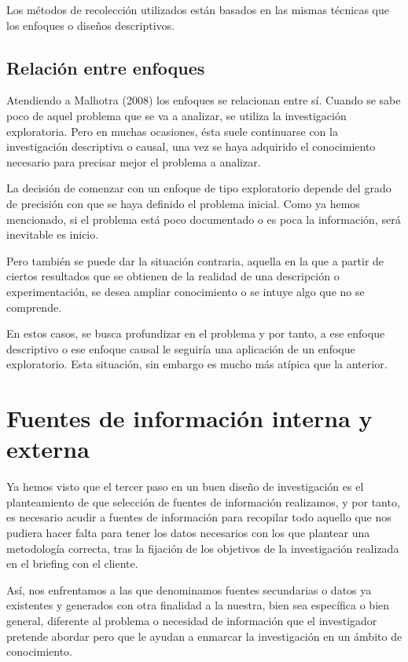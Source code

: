 \documentclass[
]{book}
\begin{document}
Los métodos de recolección utilizados están basados en las mismas técnicas que los enfoques o diseños descriptivos.

\hypertarget{relaciuxf3n-entre-enfoques}{%
\subsection{Relación entre enfoques}\label{relaciuxf3n-entre-enfoques}}

Atendiendo a Malhotra (2008) los enfoques se relacionan entre sí. Cuando se sabe poco de aquel problema que se va a analizar, se utiliza la investigación exploratoria. Pero en muchas ocasiones, ésta suele continuarse con la investigación descriptiva o causal, una vez se haya adquirido el conocimiento necesario para precisar mejor el problema a analizar.

La decisión de comenzar con un enfoque de tipo exploratorio depende del grado de precisión con que se haya definido el problema inicial. Como ya hemos mencionado, si el problema está poco documentado o es poca la información, será inevitable es inicio.

Pero también se puede dar la situación contraria, aquella en la que a partir de ciertos resultados que se obtienen de la realidad de una descripción o experimentación, se desea ampliar conocimiento o se intuye algo que no se comprende.

En estos casos, se busca profundizar en el problema y por tanto, a ese enfoque descriptivo o ese enfoque causal le seguiría una aplicación de un enfoque exploratorio. Esta situación, sin embargo es mucho más atípica que la anterior.

\hypertarget{fuentes-de-informaciuxf3n-interna-y-externa}{%
\section{Fuentes de información interna y externa}\label{fuentes-de-informaciuxf3n-interna-y-externa}}

Ya hemos visto que el tercer paso en un buen diseño de investigación es el planteamiento de que selección de fuentes de información realizamos, y por tanto, es necesario acudir a fuentes de información para recopilar todo aquello que nos pudiera hacer falta para tener los datos necesarios con los que plantear una metodología correcta, tras la fijación de los objetivos de la investigación realizada en el briefing con el cliente.

Así, nos enfrentamos a las que denominamos fuentes secundarias o datos ya existentes y generados con otra finalidad a la nuestra, bien sea específica o bien general, diferente al problema o necesidad de información que el investigador pretende abordar pero que le ayudan a enmarcar la investigación en un ámbito de conocimiento.
\end{document}
